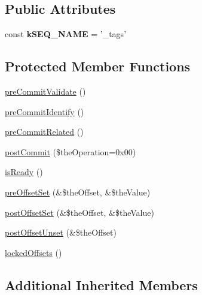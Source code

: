 \subsection*{Public Attributes}
\begin{DoxyCompactItemize}
\item 
\hypertarget{class_ontology_wrapper_1_1_tag_aed2bdf74576154de4a2cbf7dfd5f9ea5}{const {\bfseries k\-S\-E\-Q\-\_\-\-N\-A\-M\-E} = '\-\_\-tags'}\label{class_ontology_wrapper_1_1_tag_aed2bdf74576154de4a2cbf7dfd5f9ea5}

\end{DoxyCompactItemize}
\subsection*{Protected Member Functions}
\begin{DoxyCompactItemize}
\item 
\hyperlink{class_ontology_wrapper_1_1_tag_aec5b03ea98d535c599af060cba175017}{pre\-Commit\-Validate} ()
\item 
\hyperlink{class_ontology_wrapper_1_1_tag_a54fdf80ff2c3536edf3e479d5e26b4a0}{pre\-Commit\-Identify} ()
\item 
\hyperlink{class_ontology_wrapper_1_1_tag_a8e0b88cc69d2db4a6688eaa50e541f1c}{pre\-Commit\-Related} ()
\item 
\hyperlink{class_ontology_wrapper_1_1_tag_a6edfdc7fca0215a2456912f83893ef99}{post\-Commit} (\$the\-Operation=0x00)
\item 
\hyperlink{class_ontology_wrapper_1_1_tag_a43aac595d9e78147643e4c6136efa2b1}{is\-Ready} ()
\item 
\hyperlink{class_ontology_wrapper_1_1_tag_ae7319b52b64dc1dabd7da6e5fbc24bf3}{pre\-Offset\-Set} (\&\$the\-Offset, \&\$the\-Value)
\item 
\hyperlink{class_ontology_wrapper_1_1_tag_a9cc2af6aacbb8bbc52d4a4a641a2ae25}{post\-Offset\-Set} (\&\$the\-Offset, \&\$the\-Value)
\item 
\hyperlink{class_ontology_wrapper_1_1_tag_acdee636ad46bbe434fd47635a06d4495}{post\-Offset\-Unset} (\&\$the\-Offset)
\item 
\hyperlink{class_ontology_wrapper_1_1_tag_a191b408968b0d9bc9e8e2e8fadd24060}{locked\-Offsets} ()
\end{DoxyCompactItemize}
\subsection*{Additional Inherited Members}


